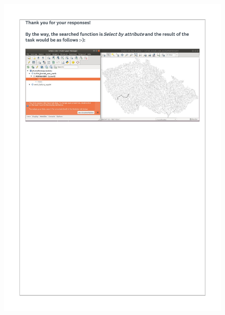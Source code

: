 \documentclass[a4paper,10pt,twoside]{article}
\begin{document}
 \newpage
 \begin{figure}[hbt!]
 \begin{center}
 \includegraphics[width=15.5cm]{../surveys/questionnaires/survey2-page7_final.pdf}
 \end{center}
 \end{figure}
\end{document}
